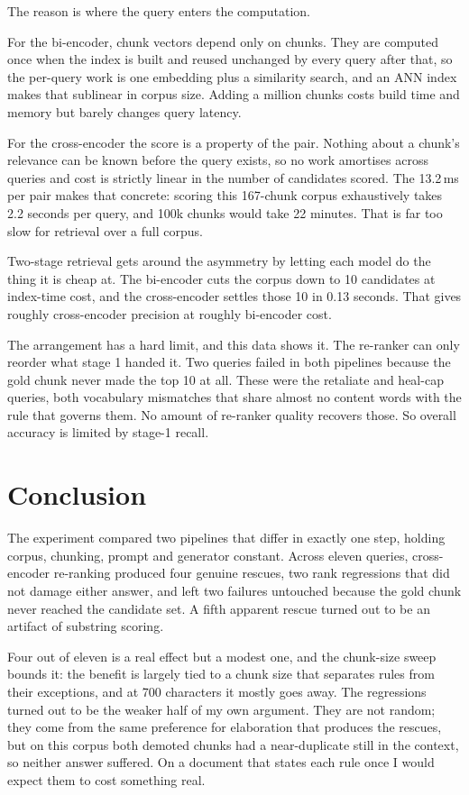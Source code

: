 \documentclass[11pt,a4paper]{article}
\begin{document}
\medskip
The reason is where the query enters the computation.

For the bi-encoder, chunk vectors depend only on chunks. They are computed once when the
index is built and reused unchanged by every query after that, so the per-query work is one
embedding plus a similarity search, and an ANN index makes that sublinear in corpus size.
Adding a million chunks costs build time and memory but barely changes query latency.

For the cross-encoder the score is a property of the pair. Nothing about a chunk's relevance
can be known before the query exists, so no work amortises across queries and cost is
strictly linear in the number of candidates scored. The 13.2\,ms per pair makes that
concrete: scoring this 167-chunk corpus exhaustively takes 2.2 seconds per query, and 100k
chunks would take 22 minutes. That is far too slow for retrieval over a full corpus.

Two-stage retrieval gets around the asymmetry by letting each model do the thing it is cheap
at. The bi-encoder cuts the corpus down to 10 candidates at index-time cost, and the
cross-encoder settles those 10 in 0.13 seconds. That gives roughly cross-encoder precision at roughly
bi-encoder cost.

The arrangement has a hard limit, and this data shows it. The re-ranker can only reorder what
stage 1 handed it. Two queries failed in both pipelines because the gold chunk never made the
top 10 at all. These were the retaliate and heal-cap queries, both vocabulary mismatches that share
almost no content words with the rule that governs them. No amount of re-ranker quality
recovers those. So overall accuracy is limited by stage-1 recall.

\section{Conclusion}

The experiment compared two pipelines that differ in exactly one step, holding corpus,
chunking, prompt and generator constant. Across eleven queries, cross-encoder re-ranking
produced four genuine rescues, two rank regressions that did not damage either answer, and
left two failures untouched because the gold chunk never reached the candidate set. A fifth
apparent rescue turned out to be an artifact of substring scoring.

Four out of eleven is a real effect but a modest one, and the chunk-size sweep bounds it:
the benefit is largely tied to a chunk size that separates rules from their exceptions, and
at 700 characters it mostly goes away. The regressions turned out to be the weaker half of
my own argument. They are not random; they come from the same preference for elaboration
that produces the rescues, but on this corpus both demoted chunks had a near-duplicate
still in the context, so neither answer suffered. On a document that states each rule once I
would expect them to cost something real.
\end{document}
